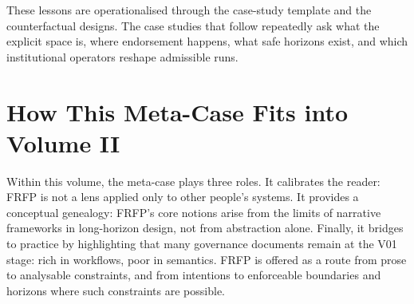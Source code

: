 These lessons are operationalised through the case-study template and the counterfactual designs. The case studies that follow repeatedly ask what the explicit space is, where endorsement happens, what safe horizons exist, and which institutional operators reshape admissible runs.

\section{How This Meta-Case Fits into Volume II}

Within this volume, the meta-case plays three roles. It calibrates the reader: FRFP is not a lens applied only to other people’s systems. It provides a conceptual genealogy: FRFP’s core notions arise from the limits of narrative frameworks in long-horizon design, not from abstraction alone. Finally, it bridges to practice by highlighting that many governance documents remain at the V01 stage: rich in workflows, poor in semantics. FRFP is offered as a route from prose to analysable constraints, and from intentions to enforceable boundaries and horizons where such constraints are possible.
